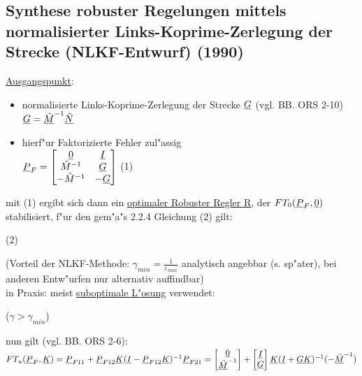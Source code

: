 \documentclass[openany,a4paper,11pt]{book}
\begin{document}
\subsection{Synthese robuster Regelungen mittels normalisierter Links-Koprime-Zerlegung der Strecke (NLKF-Entwurf) (1990)}
\uline{Ausgangspunkt}: \begin{itemize}
    \item normalisierte Links-Koprime-Zerlegung der Strecke $\uline{G}$ (vgl. BB. ORS 2-10)\\
    $\uline{G}=\uline{\tilde{M}}^{-1}\uline{\tilde{N}}$
    \item hierf"ur Faktorizierte Fehler zul"assig\\
    $\uline{P}_F=\begin{bmatrix}\uline{0}&\uline{I}\\\tilde{M}^{-1}&\uline{G}\\ -\tilde{M}^{-1}&-\uline{G}\end{bmatrix}$ \quad (1)
\end{itemize}
mit (1) ergibt sich dann ein \uline{optimaler Robuster Regler \uline{R}}, der $FT_0(\uline{P}_F,\uline{0})$ stabilisiert, f"ur den gem"a"s 2.2.4 Gleichung (2) gilt:\\
\begin{centering} \quad (2)\\[2pt] \end{centering}
(Vorteil der NLKF-Methode: $\displaystyle\gamma_{min}=\frac{1}{\varepsilon_{max}}$ analytisch angebbar (s. sp"ater), bei anderen Entw"urfen nur alternativ auffindbar)\\
in Praxis: meist \uline{suboptimale L"osung} verwendet:\\[3pt]
\begin{centering} \quad ($\gamma>\gamma_{min}$)\\\end{centering}
nun gilt (vgl. BB. ORS 2-6):\\
$FT_u(\uline{P}_F,\uline{K})=\uline{P}_{F11}+\uline{P}_{F12}\uline{K}(\uline{I}-\uline{P}_{F12}\uline{K})^{-1}\uline{P}_{F21}=\begin{bmatrix}\uline{0}\\\uline{\tilde{M}}^{-1}\end{bmatrix}+\begin{bmatrix}\uline{I}\\\uline{G}\end{bmatrix}\uline{K}(\uline{I}+\uline{GK})^{-1}(-\uline{\tilde{M}}^{-1})$\\
\end{document}
